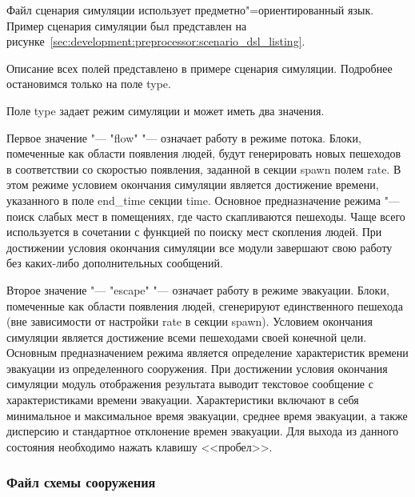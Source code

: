 Файл сценария симуляции использует предметно"=ориентированный язык.
Пример сценария симуляции был представлен на рисунке~\ref{sec:development:preprocessor:scenario_dsl_listing}.
%

Описание всех полей представлено в примере сценария симуляции. Подробнее остановимся только на поле type.

Поле type задает режим симуляции и может иметь два значения.

Первое значение "--- "flow" "--- означает работу в режиме потока.
Блоки, помеченные как области появления людей, будут генерировать новых пешеходов в соответствии со скоростью появления,
заданной в секции spawn полем rate.
В этом режиме условием окончания симуляции является достижение времени, указанного в поле end\_time секции time.
Основное предназначение режима "--- поиск слабых мест в помещениях, где часто скапливаются пешеходы.
Чаще всего используется в сочетании с функцией по поиску мест скопления людей.
При достижении условия окончания симуляции все модули завершают свою работу без каких-либо дополнительных сообщений.

Второе значение "--- "escape" "--- означает работу в режиме эвакуации.
Блоки, помеченные как области появления людей, сгенерируют единственного пешехода (вне зависимости от настройки rate в секции spawn).
Условием окончания симуляции является достижение всеми пешеходами своей конечной цели.
Основным предназначением режима является определение характеристик времени эвакуации из определенного сооружения.
При достижении условия окончания симуляции модуль отображения результата выводит текстовое сообщение с
характеристиками времени эвакуации. Характеристики включают в себя минимальное и максимальное время эвакуации,
среднее время эвакуации, а также дисперсию и стандартное отклонение времен эвакуации.
Для выхода из данного состояния необходимо нажать клавишу <<пробел>>.


\subsubsection{Файл схемы сооружения}
\label{sec:manual:input:building_scheme}

